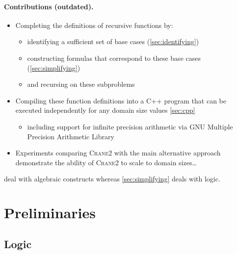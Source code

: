 \documentclass{article}
\theoremstyle{definition}
\newcommand{\Cranetwo}{\textsc{Crane2}}
\begin{document}
\paragraph{Contributions (outdated).}
\begin{itemize}
  \item Completing the definitions of recursive functions by:
  \begin{itemize}
    \item identifying a sufficient set of base cases (\cref{sec:identifying})
    \item constructing formulas that correspond to these base cases
          (\cref{sec:simplifying})
    \item and recursing on these subproblems
  \end{itemize}
  \item Compiling these function definitions into a C++ program that can be
        executed independently for any domain size values \cref{sec:cpp}
        \begin{itemize}
          \item including support for infinite precision arithmetic via GNU
                Multiple Precision Arithmetic Library
        \end{itemize}
  \item Experiments comparing \Cranetwo{} with the main alternative approach
        demonstrate the ability of \Cranetwo{} to scale to domain sizes\dots
\end{itemize}

 deal with algebraic constructs whereas
\cref{sec:simplifying} deals with logic.

\section{Preliminaries}

\subsection{Logic}
\end{document}
